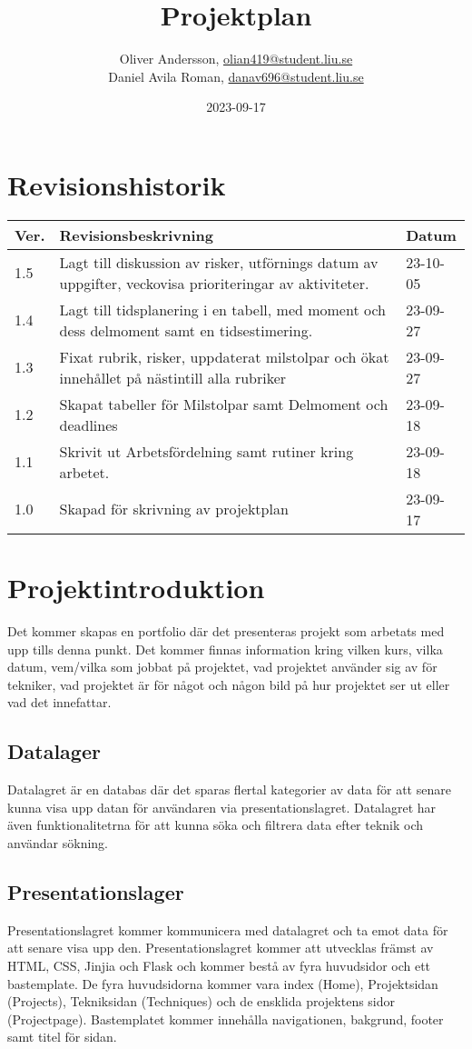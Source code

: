 \documentclass{TDP003mall}
\author{Oliver Andersson, \url{olian419@student.liu.se}\\
  Daniel Avila Roman, \url{danav696@student.liu.se}}
\title{Projektplan}
\date{2023-09-17}
\begin{document}
\projectpage
\section{Revisionshistorik}
\begin{table}[!h]
\begin{tabularx}{\linewidth}{|l|X|l|}
\hline
Ver. & Revisionsbeskrivning & Datum \\\hline
1.5 & Lagt till diskussion av risker, utförnings datum av uppgifter, veckovisa prioriteringar av aktiviteter. & 23-10-05 \\\hline
1.4 & Lagt till tidsplanering i en tabell, med moment och dess delmoment samt en tidsestimering. & 23-09-27 \\\hline
1.3 & Fixat rubrik, risker, uppdaterat milstolpar och ökat innehållet på nästintill alla rubriker & 23-09-27 \\\hline
1.2 & Skapat tabeller för Milstolpar samt Delmoment och deadlines & 23-09-18 \\\hline
1.1 & Skrivit ut Arbetsfördelning samt rutiner kring arbetet. & 23-09-18 \\\hline
1.0 & Skapad för skrivning av projektplan & 23-09-17 \\\hline
\end{tabularx}
\end{table}

\newpage

\section{Projektintroduktion}
Det kommer skapas en portfolio där det presenteras projekt 
som arbetats med upp tills denna punkt. Det kommer finnas information kring vilken kurs, vilka datum, 
vem/vilka som jobbat på projektet, vad projektet använder sig av för tekniker, vad projektet är för något
och någon bild på hur projektet ser ut eller vad det innefattar.

\subsection{Datalager}
Datalagret är en databas där det sparas flertal kategorier av data 
för att senare kunna visa upp datan för användaren via presentationslagret.
Datalagret har även funktionalitetrna för att kunna söka och filtrera data efter teknik och användar sökning.

\subsection{Presentationslager}
Presentationslagret kommer kommunicera med datalagret och ta emot data för att
senare visa upp den. Presentationslagret kommer att utvecklas främst av 
HTML, CSS, Jinjia och Flask och kommer bestå av fyra huvudsidor och ett bastemplate. 
De fyra huvudsidorna kommer vara index (Home), Projektsidan (Projects), Tekniksidan (Techniques) och de ensklida projektens sidor (Projectpage).
Bastemplatet kommer innehålla navigationen, bakgrund, footer samt titel för sidan.
\end{document}

